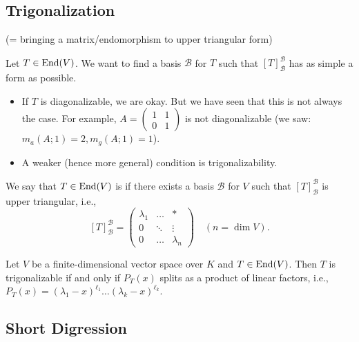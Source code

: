 \subsection{Trigonalization}
(= bringing a matrix/endomorphism to upper triangular form)

\begin{question}\label{q:trig_basis}
  Let $T \in \operatorname{End}(V)$. We want to find a basis $\mathcal{B}$ for $T$ such that $[T]_{\mathcal{B}}^{\mathcal{B}}$ has as simple a form as possible.
\end{question}
\begin{itemize}
  \item If $T$ is diagonalizable, we are okay. But we have seen that this is not always the case. For example, $A = \left(\begin{smallmatrix} 1 & 1 \\ 0 & 1 \end{smallmatrix}\right)$ is not diagonalizable (we saw: $m_a(A; 1) = 2, m_g(A; 1) = 1$).
  \item A weaker (hence more general) condition is trigonalizability.
\end{itemize}

\begin{definition} \label{def:trigonalizable}
  We say that $T \in \operatorname{End}(V)$ is  if there exists a basis $\mathcal{B}$ for $V$ such that $[T]_{\mathcal{B}}^{\mathcal{B}}$ is upper triangular, i.e.,
  \begin{equation} \label{eq:upper_triangular_def}
    [T]_{\mathcal{B}}^{\mathcal{B}} = \begin{pmatrix} \lambda_1 & \dots & * \\ 0 & \ddots & \vdots \\ 0 & \dots & \lambda_n \end{pmatrix} \quad (n = \dim V).
  \end{equation}
\end{definition}

\begin{theorem} \label{thm:trig_condition}
  Let $V$ be a finite-di\-men\-sional vector space over $K$ and $T \in \operatorname{End}(V)$. Then $T$ is trigonalizable if and only if $P_T(x)$ splits as a product of linear factors, i.e., $P_T(x) = (\lambda_1 - x)^{\ell_1} \dots (\lambda_k - x)^{\ell_k}$.
\end{theorem}

\subsection*{Short Digression}

